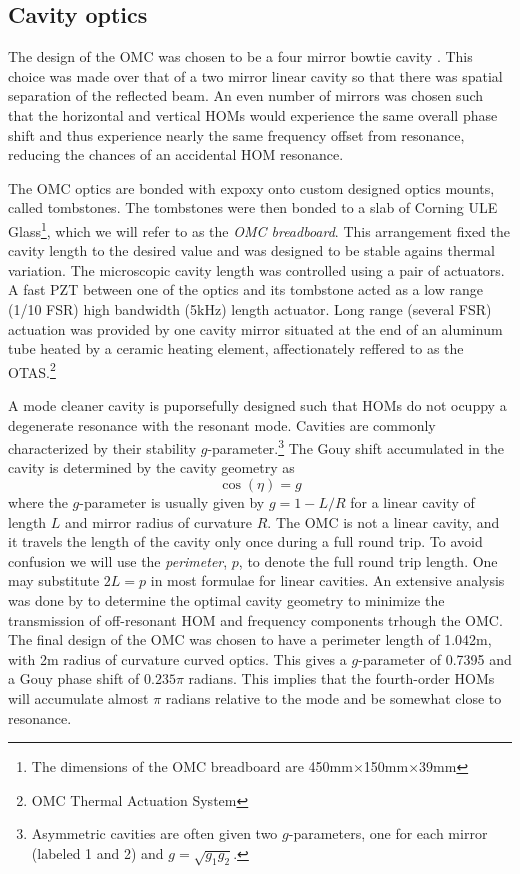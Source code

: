 \subsection{Cavity optics}
The design of the OMC was chosen to be a four mirror bowtie cavity . %
This choice was made over that of a two mirror linear cavity so that there was spatial separation of the reflected beam. %
An even number of mirrors was chosen such that the horizontal and vertical HOMs would experience the same overall phase shift and thus experience nearly the same frequency offset from resonance, reducing the chances of an accidental HOM resonance.

The OMC optics are bonded with  expoxy onto custom designed  optics mounts, called tombstones. %
The tombstones were then bonded to a slab of Corning ULE Glass\footnote{The dimensions of the OMC breadboard are 450mm$\times$150mm$\times$39mm}, which we will refer to as the \emph{OMC breadboard}. %
This arrangement fixed the cavity length to the desired value and was designed to be stable agains thermal variation. %
The microscopic cavity length was controlled using a pair of actuators. %
A fast PZT between one of the optics and its tombstone acted as a low range (1/10 FSR) high bandwidth (5kHz) length actuator. %
Long range (several FSR) actuation was provided by one cavity mirror situated at the end of an aluminum tube heated by a ceramic heating element, affectionately reffered to as the OTAS.\footnote{OMC Thermal Actuation System}

A mode cleaner cavity is puporsefully designed such that HOMs do not ocuppy a degenerate resonance with the resonant  mode. %
Cavities are commonly characterized by their stability $g$-parameter.\footnote{Asymmetric cavities are often given two $g$-parameters, one for each mirror (labeled 1 and 2) and $g=\sqrt{g_1 g_2}$.} The Gouy shift accumulated in the cavity is determined by the cavity geometry as 
\begin{equation}
\label{eqn:gouyg}
\cos(\eta)=g
\end{equation}
where the $g$-parameter is usually given by $g=1-L/R$ for a linear cavity of length $L$ and mirror radius of curvature $R$. %
The OMC is not a linear cavity, and it travels the length of the cavity only once during a full round trip. %
To avoid confusion we will use the \emph{perimeter}, $p$, to denote the full round trip length. %
One may substitute $2L=p$ in most formulae for linear cavities. %
An extensive analysis was done by  to determine the optimal cavity geometry to minimize the transmission of off-resonant HOM and frequency components trhough the OMC. The final design of the OMC was chosen to have a perimeter length of 1.042m, with 2m radius of curvature curved optics. %
This gives a $g$-parameter of 0.7395 and a Gouy phase shift of $0.235\pi$ radians. %
This implies that the fourth-order HOMs will accumulate almost $\pi$ radians relative to the  mode and be somewhat close to resonance.

